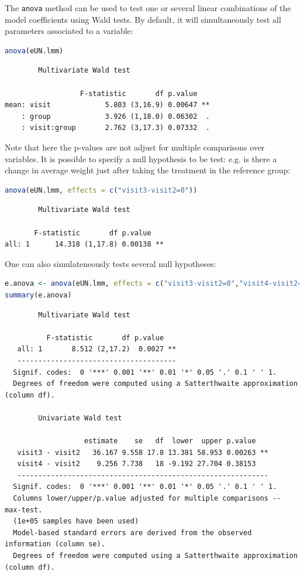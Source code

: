 \documentclass[12pt]{article}
\begin{document}
The \texttt{anova} method can be used to test one or several linear
combinations of the model coefficients using Wald tests. By default,
it will simultaneously test all parameters associated to a variable:
\begin{lstlisting}[language=r,numbers=none]
anova(eUN.lmm)
\end{lstlisting}

\label{}
\begin{verbatim}
		Multivariate Wald test 

                  F-statistic       df p.value   
mean: visit             5.803 (3,16.9) 0.00647 **
    : group             3.926 (1,18.0) 0.06302  .
    : visit:group       2.762 (3,17.3) 0.07332  .
\end{verbatim}


Note that here the p-values are not adjust for multiple comparisons
over variables. It is possible to specify a null hypothesis to be
test: e.g. is there a change in average weight just after taking the
treatment in the reference group:
\begin{lstlisting}[language=r,numbers=none]
anova(eUN.lmm, effects = c("visit3-visit2=0"))
\end{lstlisting}

\label{}
\begin{verbatim}
		Multivariate Wald test 

       F-statistic       df p.value   
all: 1      14.318 (1,17.8) 0.00138 **
\end{verbatim}


One can also simulateneously tests several null hypotheses:
\begin{lstlisting}[language=r,numbers=none]
e.anova <- anova(eUN.lmm, effects = c("visit3-visit2=0","visit4-visit2=0"))
summary(e.anova)
\end{lstlisting}

\label{}
\begin{verbatim}
		Multivariate Wald test 

          F-statistic       df p.value   
   all: 1       8.512 (2,17.2)  0.0027 **
   -------------------------------------- 
  Signif. codes:  0 '***' 0.001 '**' 0.01 '*' 0.05 '.' 0.1 ' ' 1.
  Degrees of freedom were computed using a Satterthwaite approximation (column df). 

		Univariate Wald test 

                   estimate    se   df  lower  upper p.value   
   visit3 - visit2   36.167 9.558 17.8 13.381 58.953 0.00263 **
   visit4 - visit2    9.256 7.738   18 -9.192 27.704 0.38153   
   ------------------------------------------------------------ 
  Signif. codes:  0 '***' 0.001 '**' 0.01 '*' 0.05 '.' 0.1 ' ' 1.
  Columns lower/upper/p.value adjusted for multiple comparisons -- max-test.
  (1e+05 samples have been used)
  Model-based standard errors are derived from the observed information (column se). 
  Degrees of freedom were computed using a Satterthwaite approximation (column df).
\end{verbatim}
\end{document}
